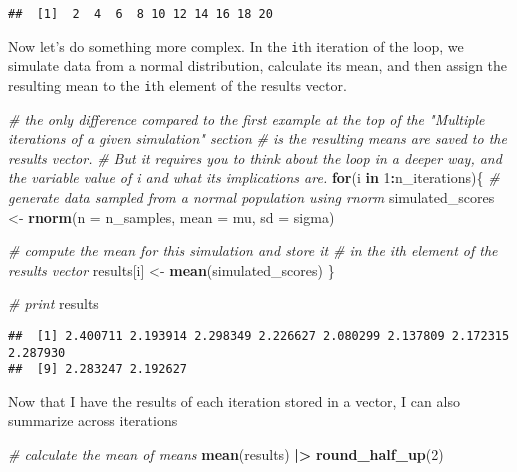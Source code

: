 \documentclass[
]{article}
\newenvironment{Shaded}{\begin{snugshade}}{\end{snugshade}}
\newcommand{\AttributeTok}[1]{\textcolor[rgb]{0.13,0.29,0.53}{#1}}
\newcommand{\CommentTok}[1]{\textcolor[rgb]{0.56,0.35,0.01}{\textit{#1}}}
\newcommand{\ControlFlowTok}[1]{\textcolor[rgb]{0.13,0.29,0.53}{\textbf{#1}}}
\newcommand{\DecValTok}[1]{\textcolor[rgb]{0.00,0.00,0.81}{#1}}
\newcommand{\FunctionTok}[1]{\textcolor[rgb]{0.13,0.29,0.53}{\textbf{#1}}}
\newcommand{\NormalTok}[1]{#1}
\newcommand{\OtherTok}[1]{\textcolor[rgb]{0.56,0.35,0.01}{#1}}
\newcommand{\SpecialCharTok}[1]{\textcolor[rgb]{0.81,0.36,0.00}{\textbf{#1}}}
\begin{document}
\begin{verbatim}
##  [1]  2  4  6  8 10 12 14 16 18 20
\end{verbatim}

Now let's do something more complex. In the \texttt{i}th iteration of
the loop, we simulate data from a normal distribution, calculate its
mean, and then assign the resulting mean to the \texttt{i}th element of
the results vector.

\begin{Shaded}
\begin{Highlighting}[]
\CommentTok{\# the only difference compared to the first example at the top of the "Multiple iterations of a given simulation" section}
\CommentTok{\# is the resulting means are saved to the results vector.}
\CommentTok{\# But it requires you to think about the loop in a deeper way, and the variable value of i and what its implications are.}
\ControlFlowTok{for}\NormalTok{(i }\ControlFlowTok{in} \DecValTok{1}\SpecialCharTok{:}\NormalTok{n\_iterations)\{}
  \CommentTok{\# generate data sampled from a normal population using rnorm}
\NormalTok{  simulated\_scores }\OtherTok{\textless{}{-}} 
    \FunctionTok{rnorm}\NormalTok{(}\AttributeTok{n =}\NormalTok{ n\_samples, }
          \AttributeTok{mean =}\NormalTok{ mu, }
          \AttributeTok{sd =}\NormalTok{ sigma)}
  
  \CommentTok{\# compute the mean for this simulation and store it }
  \CommentTok{\# in the \textasciigrave{}i\textasciigrave{}th element of the results vector}
\NormalTok{  results[i] }\OtherTok{\textless{}{-}} \FunctionTok{mean}\NormalTok{(simulated\_scores)}
\NormalTok{\}}

\CommentTok{\# print}
\NormalTok{results}
\end{Highlighting}
\end{Shaded}

\begin{verbatim}
##  [1] 2.400711 2.193914 2.298349 2.226627 2.080299 2.137809 2.172315 2.287930
##  [9] 2.283247 2.192627
\end{verbatim}

Now that I have the results of each iteration stored in a vector, I can
also summarize across iterations

\begin{Shaded}
\begin{Highlighting}[]
\CommentTok{\# calculate the mean of means}
\FunctionTok{mean}\NormalTok{(results) }\SpecialCharTok{|\textgreater{}} \FunctionTok{round\_half\_up}\NormalTok{(}\DecValTok{2}\NormalTok{)}
\end{Highlighting}
\end{Shaded}
\end{document}
